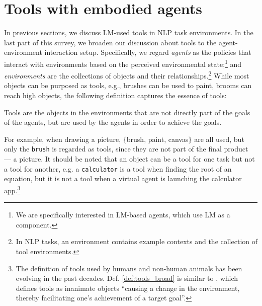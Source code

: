 \section{Tools with embodied agents}
\label{sec:embodied}


In previous sections, we discuss LM-used tools in NLP task environments. In the last part of this survey, we broaden our discussion about tools to the agent-environment interaction setup. 
Specifically, we regard \emph{agents} as the policies that interact with environments based on the perceived environmental state;\footnote{We are specifically interested in LM-based agents, which use LM as a component.} and \emph{environments} are the collections of objects and their relationships.\footnote{In NLP tasks, an environment contains example contexts and the collection of tool environments.}
While most objects can be purposed as tools, e.g., brushes can be used to paint, brooms can reach high objects, %
the following definition captures the essence of tools:

\begin{definition}[Tools]
\label{def:tools_broad}
Tools are the objects in the environments that are not directly part of the goals of the agents, but are used by the agents in order to achieve the goals.
\end{definition}

For example, when drawing a picture, $\{$brush, paint, canvas$\}$ are all used, but only the \texttt{brush} is regarded as tools, since they are not part of the final product --- a picture.
It should be noted that an object can be a tool for one task but not a tool for another, e.g. a \texttt{calculator} is a tool when finding the root of an equation, but it is not a tool when a virtual agent is launching the calculator app.\footnote{The definition of tools used by humans and non-human animals has been evolving in the past decades. Def. \ref{def:tools_broad} is similar to \citet{beauchamp2011oxford}, which defines tools as inanimate objects ``causing a change in the environment, thereby facilitating one's achievement of a target goal''.}


